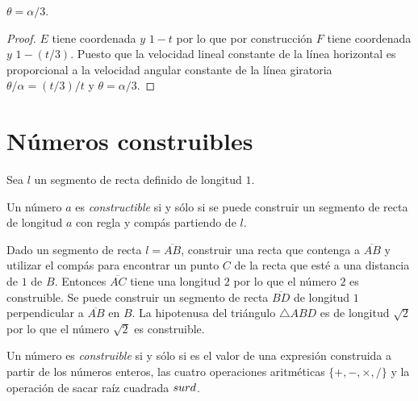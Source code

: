 \begin{theorem}
$\theta = \alpha/3$.
\end{theorem}
\begin{proof}
$E$ tiene coordenada $y$ $1-t$ por lo que por construcción $F$ tiene coordenada $y$ $1-(t/3)$. Puesto que la velocidad lineal constante de la línea horizontal es proporcional a la velocidad angular constante de la línea giratoria $\theta/\alpha = (t/3)/t$ y $\theta = \alpha/3$.
\end{proof}


\section{Números construibles}\label{s.trisect-constructible}

Sea $l$ un segmento de recta definido de longitud $1$.
\begin{definition}
Un número $a$ es \emph{constructible} si y sólo si se puede construir un segmento de recta de longitud $a$ con regla y compás partiendo de $l$.
\end{definition}

Dado un segmento de recta $l=\overline{AB}$, construir una recta que contenga a $\overline{AB}$ y utilizar el compás para encontrar un punto $C$ de la recta que esté a una distancia de $1$ de $B$. Entonces $\overline{AC}$ tiene una longitud $2$ por lo que el número $2$ es construible. Se puede construir un segmento de recta $\overline{BD}$ de longitud $1$ perpendicular a $\overline{AB}$ en $B$. La hipotenusa del triángulo $\triangle ABD$ es de longitud $\sqrt{2}$ por lo que el número $\sqrt{2}$ es construible.

\begin{theorem}\label{thm.trisect-constructible}
Un número es \emph{construible} si y sólo si es el valor de una expresión construida a partir de los números enteros, las cuatro operaciones aritméticas $\{+,-,\times,/\}$ y la operación de sacar raíz cuadrada $\\surd$.
\end{theorem}

